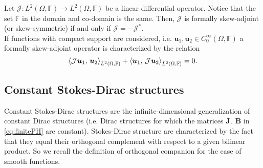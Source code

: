 \begin{definition}
	\label{def:skewoper}
	Let $\mathcal{J}: L^2(\Omega, \mathbb{F}) \rightarrow L^2(\Omega, \mathbb{F})$ be a linear differential operator. Notice that the set $\mathbb{F}$ in the domain and co-domain is the same. Then, $\mathcal{J}$ is formally skew-adjoint (or skew-symmetric) if and only if $\mathcal{J} = -\mathcal{J}^*$. \\
	
	If functions with compact support are considered, i.e. $\bm{u}_1, \bm{u}_2 \in  C^{\infty}_0(\Omega, \mathbb{F})$ a formally skew-adjoint operator is characterized by the relation 
	\begin{equation}
	\inner[L^2(\Omega, \bbF)]{\mathcal{J}\bm{u}_1}{\bm{u}_2} + \inner[L^2(\Omega, \bbF)]{\bm{u}_1}{\mathcal{J}\bm{u}_2} = 0.
	\end{equation}{}
\end{definition}

\subsection{Constant Stokes-Dirac structures}

Constant Stokes-Dirac structures are the infinite-dimensional generalization of constant Dirac structures (i.e. Dirac structures for which the matrices $\mathbf{J}, \; \mathbf{B}$ in \eqref{eq:finitePH} are constant). Stokes-Dirac structure are characterized by the fact that they  equal their orthogonal complement with respect to a given bilinear product. So we recall the definition of orthogonal companion for the case of smooth functions.

